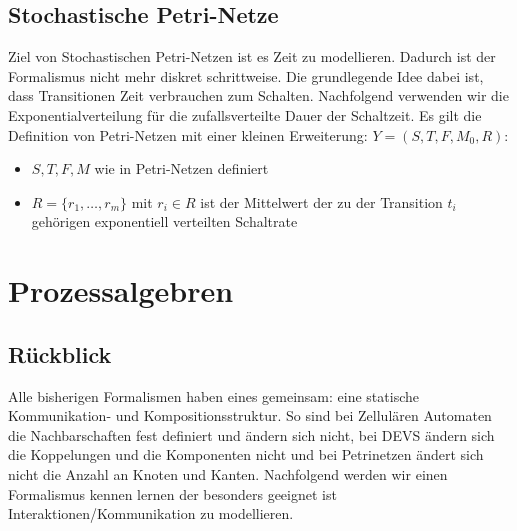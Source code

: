 \documentclass[11pt, fleqn, a4paper, leqno]{scrartcl} %
\begin{document}
	\subsection{Stochastische Petri-Netze}
		Ziel von Stochastischen Petri-Netzen ist es Zeit zu modellieren. Dadurch ist der Formalismus nicht mehr diskret schrittweise. Die grundlegende Idee dabei ist, dass Transitionen Zeit verbrauchen zum Schalten. Nachfolgend verwenden wir die Exponentialverteilung für die zufallsverteilte Dauer der Schaltzeit. Es gilt die Definition von Petri-Netzen mit einer kleinen Erweiterung: $Y = (S,T,F,M_{0},R)$:
		\begin{itemize}
			\item $S,T,F,M$ wie in Petri-Netzen definiert
			\item $R = \{r_{1},\dots,r_{m}\}$ mit $r_{i} \in R$ ist der Mittelwert der zu der Transition $t_{i}$ gehörigen exponentiell verteilten Schaltrate
		\end{itemize}
		
\section{Prozessalgebren}
	\subsection{Rückblick}
		Alle bisherigen Formalismen haben eines gemeinsam: eine statische Kommunikation- und Kompositionsstruktur. So sind bei Zellulären Automaten die Nachbarschaften fest definiert und ändern sich nicht, bei DEVS ändern sich die Koppelungen und die Komponenten nicht und bei Petrinetzen ändert sich nicht die Anzahl an Knoten und Kanten. Nachfolgend werden wir einen Formalismus kennen lernen der besonders geeignet ist Interaktionen/Kommunikation zu modellieren.
\end{document}

